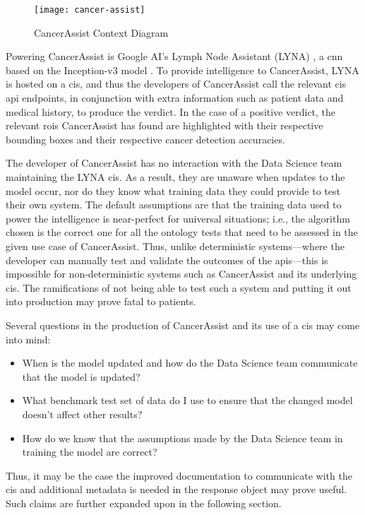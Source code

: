 \begin{figure}[th]
  \texttt{[image: cancer-assist]}
  \caption{CancerAssist Context Diagram}
  \label{fig:introduction:motivation:scenario:cancer}
\end{figure}

Powering CancerAssist is Google AI's Lymph Node Assistant (LYNA) \citep{Liu:2018fa}, a \gls{cnn} based on the Inception-v3 model \citep{Szegedy:2016ws,Krizhevsky:2012wl}. To provide intelligence to CancerAssist, LYNA is hosted on a \gls{cis}, and thus the developers of CancerAssist call the relevant \gls{cis} \gls{api} endpoints, in conjunction with extra information such as patient data and medical history, to produce the verdict. In the case of a positive verdict, the relevant \glspl{roi} CancerAssist has found are highlighted with their respective bounding boxes and their respective cancer detection accuracies.

The developer of CancerAssist has no interaction with the Data Science team maintaining the LYNA \gls{cis}. As a result, they are unaware when updates to the model occur, nor do they know what training data they could provide to test their own system. The default assumptions are that the training data used to power the intelligence is near-perfect for universal situations; i.e., the algorithm chosen is the correct one for all the ontology tests that need to be assessed in the given use case of CancerAssist. Thus, unlike deterministic systems---where the developer can manually test and validate the outcomes of the \glspl{api}---this is impossible for non-deterministic systems such as CancerAssist and its underlying \gls{cis}. The ramifications of not being able to test such a system and putting it out into production may prove fatal to patients.

Several questions in the production of CancerAssist and its use of a \gls{cis} may come into mind:

\begin{itemize}
  \item When is the model updated and how do the Data Science team communicate that the model is updated?
  \item What benchmark test set of data do I use to ensure that the changed model doesn't affect other results?
  \item How do we know that the assumptions made by the Data Science team in training the model are correct?
\end{itemize}

Thus, it may be the case the improved documentation to communicate with the \gls{cis} and additional metadata is needed in the response object may prove useful. Such claims are further expanded upon in the following section.

